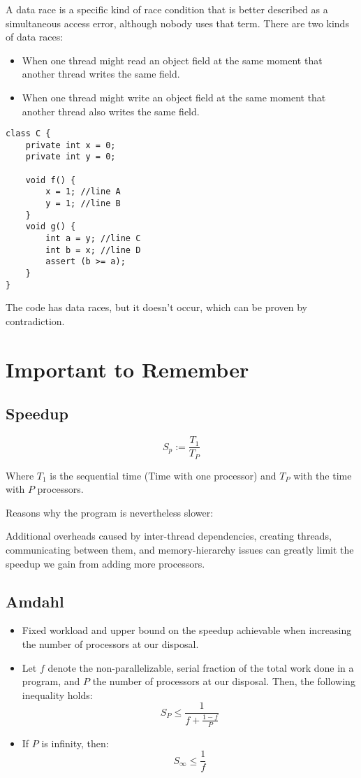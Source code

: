 \documentclass{article}
\begin{document}
A data race is a specific kind of race condition that is better described as a simultaneous access error, although nobody uses that term. There are two kinds of data races:

\begin{itemize}
    \item When one thread might read an object field at the same moment that another thread writes the same field.
    \item When one thread might write an object field at the same moment that another thread also writes the same field.
\end{itemize}

\begin{lstlisting}
class C {
    private int x = 0;
    private int y = 0;

    void f() {
        x = 1; //line A
        y = 1; //line B
    }
    void g() {
        int a = y; //line C
        int b = x; //line D
        assert (b >= a);
    }
}
\end{lstlisting}

The code has data races, but it doesn't occur, which can be proven by contradiction.

\section{Important to Remember}

\subsection{Speedup}

\[S_p := \frac{T_1}{T_P}\]

Where \(T_1\) is the sequential time (Time with one processor) and \(T_P\) with the time with \(P\) processors.

Reasons why the program is nevertheless slower:

Additional overheads caused by inter-thread dependencies, creating threads, communicating between them, and memory-hierarchy issues can greatly limit the speedup we gain from adding more processors.

\subsection{Amdahl}

\begin{itemize}
    \item Fixed workload and upper bound on the speedup achievable when increasing the number of processors at our disposal.
    \item Let \(f\) denote the non-parallelizable, serial fraction of the total work done in a program, and \(P\) the number of processors at our disposal. Then, the following inequality holds:
    \[S_P \leq \frac{1}{f + \frac{1 - f}{P}}\]
    \item If \(P\) is infinity, then:
    \[S_\infty \leq \frac{1}{f}\]
\end{itemize}
\end{document}
